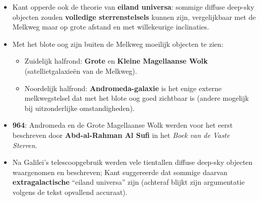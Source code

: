 \documentclass[10pt,a4paper]{article}
\begin{document}
\begin{itemize}
\begin{itemize}
    \item Het centrale vlak heet het \textbf{Galactisch Vlak}; vanuit onze positie binnenin zou een schijf als een \textbf{band langs een grote cirkel} zichtbaar zijn.
    \item Sterren buiten het vlak vergeleek hij met \textbf{kometen}: minder geordend, meer willekeurige banen.
  \end{itemize}
  \item Kant opperde ook de theorie van \textbf{eiland universa}: sommige diffuse deep-sky objecten zouden \textbf{volledige sterrenstelsels} kunnen zijn, vergelijkbaar met de Melkweg maar op grote afstand en met willekeurige inclinaties.
  \item Met het blote oog zijn buiten de Melkweg moeilijk objecten te zien:
  \begin{itemize}
    \item Zuidelijk halfrond: \textbf{Grote} en \textbf{Kleine Magellaanse Wolk} (satellietgalaxieën van de Melkweg).
    \item Noordelijk halfrond: \textbf{Andromeda-galaxie} is het enige externe melkwegstelsel dat met het blote oog goed zichtbaar is (andere mogelijk bij uitzonderlijke omstandigheden).
  \end{itemize}
  \item \textbf{964}: Andromeda en de Grote Magellaanse Wolk werden voor het eerst beschreven door \textbf{Abd-al-Rahman Al Sufi} in het \textit{Boek van de Vaste Sterren}.
  \item Na Galilei's telescoopgebruik werden vele tientallen diffuse deep-sky objecten waargenomen en beschreven; Kant suggereerde dat sommige daarvan \textbf{extragalactische} ``eiland universa'' zijn (achteraf blijkt zijn argumentatie volgens de tekst opvallend accuraat).
\end{itemize}
\end{document}

